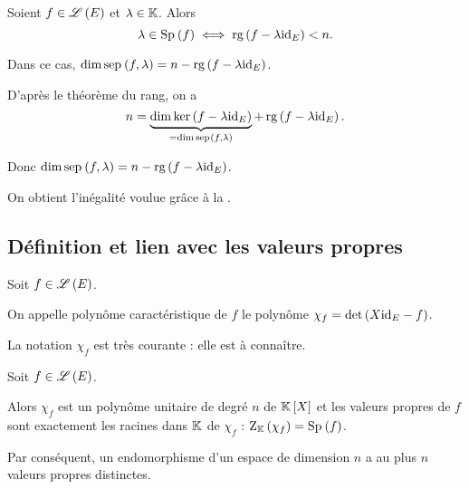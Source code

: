 \begin{prop}
Soient \(f\in\mathscr{L}\left(E\right)\) et \(\lambda\in\mathbb{K}\). Alors \[\lambda\in\Sp{f}\ssi\rg\paren{f-\lambda\id{E}}<n.\]

Dans ce cas, \(\dim\sep{f}{\lambda}=n-\rg\paren{f-\lambda\id{E}}\).
\end{prop}

\begin{dem}
D'après le théorème du rang, on a \[n=\underbrace{\dim\ker\paren{f-\lambda\id{E}}}_{=\dim\sep{f}{\lambda}}+\rg\paren{f-\lambda\id{E}}.\]

Donc \(\dim\sep{f}{\lambda}=n-\rg\paren{f-\lambda\id{E}}\).

On obtient l'inégalité voulue grâce à la .
\end{dem}

\subsection{Définition et lien avec les valeurs propres}

\begin{defi}
Soit \(f\in\mathscr{L}\left(E\right)\).

On appelle polynôme caractéristique de \(f\) le polynôme \(\chi_f=\det\left(X\mathrm{id}_{E}-f\right)\).
\end{defi}

La notation \(\chi_f\) est très courante : elle est à connaître.

\begin{theo}
Soit \(f\in\mathscr{L}\left(E\right)\).

Alors \(\chi_f\) est un polynôme unitaire de degré \(n\) de \(\poly\) et les valeurs propres de \(f\) sont exactement les racines dans \(\mathbb{K}\) de \(\chi_f\) : \(\rac{\chi_f}=\Sp{f}\).

Par conséquent, un endomorphisme d'un espace de dimension \(n\) a au plus \(n\) valeurs propres distinctes.
\end{theo}

